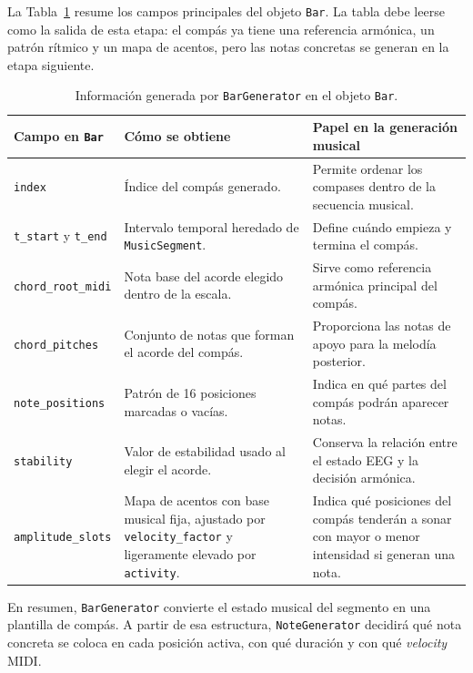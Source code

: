 \documentclass[../main.tex]{subfiles}
\begin{document}
La Tabla~\ref{tab:impl_bar_generator_bar} resume los campos principales del objeto \texttt{Bar}. La tabla debe leerse como la salida de esta etapa: el compás ya tiene una referencia armónica, un patrón rítmico y un mapa de acentos, pero las notas concretas se generan en la etapa siguiente.

\begin{table}[H]
    \centering
    \caption{Información generada por \texttt{BarGenerator} en el objeto \texttt{Bar}.}
    \label{tab:impl_bar_generator_bar}
    \footnotesize
    \setlength{\tabcolsep}{3pt}
    \renewcommand{\arraystretch}{1.10}
    \begin{tabular}{p{}p{}p{}}
        \hline
        \textbf{Campo en \texttt{Bar}} & \textbf{Cómo se obtiene} & \textbf{Papel en la generación musical} \\
        \hline
        \texttt{index} &
        Índice del compás generado. &
        Permite ordenar los compases dentro de la secuencia musical. \\
        \texttt{t\_start} y \texttt{t\_end} &
        Intervalo temporal heredado de \texttt{MusicSegment}. &
        Define cuándo empieza y termina el compás. \\
        \texttt{chord\_root\_midi} &
        Nota base del acorde elegido dentro de la escala. &
        Sirve como referencia armónica principal del compás. \\
        \texttt{chord\_pitches} &
        Conjunto de notas que forman el acorde del compás. &
        Proporciona las notas de apoyo para la melodía posterior. \\
        \texttt{note\_positions} &
        Patrón de 16 posiciones marcadas o vacías. &
        Indica en qué partes del compás podrán aparecer notas. \\
        \texttt{stability} &
        Valor de estabilidad usado al elegir el acorde. &
        Conserva la relación entre el estado EEG y la decisión armónica. \\
        \texttt{amplitude\_slots} &
        Mapa de acentos con base musical fija, ajustado por \texttt{velocity\_factor} y ligeramente elevado por \texttt{activity}. &
        Indica qué posiciones del compás tenderán a sonar con mayor o menor intensidad si generan una nota. \\
        \hline
    \end{tabular}
\end{table}

En resumen, \texttt{BarGenerator} convierte el estado musical del segmento en una plantilla de compás. A partir de esa estructura, \texttt{NoteGenerator} decidirá qué nota concreta se coloca en cada posición activa, con qué duración y con qué \textit{velocity} MIDI.
\end{document}
